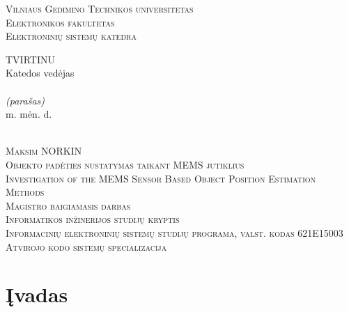\documentclass[]{vgtuef}
\begin{document}
  \begin{titlepage}
    \setcounter{page}{7}
    \thispagestyle{plain}
    \begin{center}
      \textsc{\Large Vilniaus Gedimino Technikos universitetas}\\
      \textsc{\Large Elektronikos fakultetas}\\
      \textsc{\Large Elektroninių sistemų katedra}\\[10mm]
      \hfill
      \begin{minipage}{.35\linewidth}
        \begin{flushleft}
          \uppercase{Tvirtinu}\\
          Katedos vedėjas\\[5mm]
          \makebox[1.8in]{\hrulefill}\\
          \scriptsize{\textit{(parašas)}}\\
          \normalsize{\the\year m. \makebox[0.45in]{\hrulefill} mėn. \makebox[0.15in]{\hrulefill} d.}\\
        \end{flushleft}
      \end{minipage}\\[10mm]
      \textsc{\Large Maksim NORKIN}\\[1mm]
      \textsc{\Large Objekto padėties nustatymas taikant MEMS jutiklius}\\[15mm]
      \textsc{\Large Investigation of the MEMS Sensor Based Object Position Estimation Methods}\\[10mm]
      \textsc{\large Magistro baigiamasis darbas}\\[10mm]
      \textsc{Informatikos inžinerijos studijų kryptis}\\
      \textsc{Informacinių elektroninių sistemų studijų programa, valst. kodas 621E15003}\\
      \textsc{Atvirojo kodo sistemų specializacija}\\
    \end{center}
    \afterpage{\null\newpage}
  \end{titlepage}

  \setcounter{page}{8}

  
  \afterpage{\null\newpage}

  \newpage

  \tableofcontents

  \newpage

  \section{Įvadas}
\end{document}
